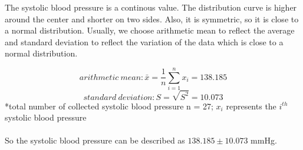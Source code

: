 \documentclass[11pt,a4paper,onside,UTF8]{article}
\begin{document}
The systolic blood pressure is a continous value. The distribution curve is higher around the center and shorter on two sides.
Also, it is symmetric, so it is close to a normal distribution.
Usually, we choose arithmetic mean to reflect the average and standard deviation to reflect the variation of the data
which is close to a normal distribution.

\begin{equation}
	arithmetic \ mean: \bar{x} = \frac{1}{n}\sum_{i = 1}^{n} x_i = 138.185
\end{equation}
\begin{equation}
	standard\ deviation: S = \sqrt{S^2} = 10.073
\end{equation}
*total number of collected systolic blood pressure n = 27; $x_i$ represents the $i^{th}$ systolic blood pressure
\\ \hspace*{\fill} \\

So the systolic blood pressure can be described as $138.185 \pm 10.073$ mmHg. 
\end{document}

